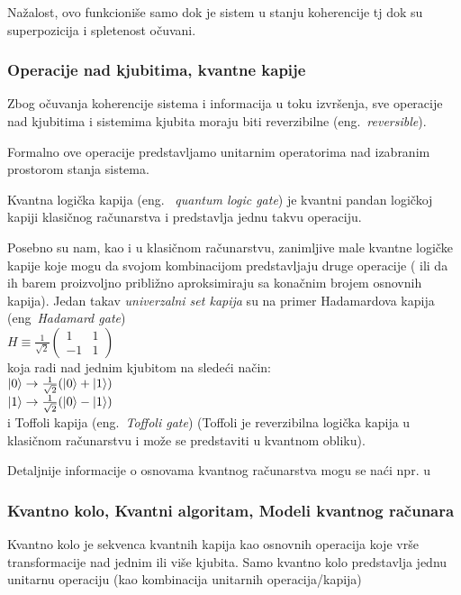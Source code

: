 \documentclass[a4paper]{article}
\begin{document}
{Nažalost, ovo funkcioniše samo dok je sistem u stanju koherencije  tj dok su superpozicija i spletenost očuvani.

\subsubsection {Operacije nad kjubitima, kvantne kapije}

Zbog očuvanja koherencije sistema i informacija u toku izvršenja, sve operacije nad kjubitima i sistemima kjubita moraju biti reverzibilne (eng.~\emph{reversible}).

Formalno ove operacije predstavljamo unitarnim operatorima nad izabranim prostorom stanja sistema.

Kvantna logička kapija (eng. ~\emph{quantum logic gate}) je kvantni pandan logičkoj kapiji klasičnog računarstva i predstavlja jednu takvu operaciju.

Posebno su nam, kao i u klasičnom računarstvu, zanimljive male kvantne logičke kapije koje mogu da svojom kombinacijom predstavljaju druge operacije ( ili da ih barem proizvoljno približno aproksimiraju sa konačnim brojem osnovnih kapija). Jedan takav \emph{univerzalni set kapija} su na primer Hadamardova kapija (eng~\emph{Hadamard gate})\\
\smallskip
$H\equiv\frac{1}{\sqrt{2}}\begin{pmatrix}
1&1\\
-1&1
\end{pmatrix}$\\
\smallskip
koja radi nad jednim kjubitom na sledeći način:\\
\smallskip
$\ket{0} \rightarrow \frac{1}{\sqrt{2}}(\ket{0} + \ket{1})$\\
\smallskip
$\ket{1} \rightarrow \frac{1}{\sqrt{2}}(\ket{0} - \ket{1})$\\

i Toffoli kapija (eng.~\emph{Toffoli gate}) (Toffoli je reverzibilna logička kapija u klasičnom računarstvu i može se predstaviti u kvantnom obliku).

Detaljnije informacije o osnovama kvantnog računarstva mogu se naći npr. u \cite{knjiga}

\subsubsection{Kvantno kolo, Kvantni algoritam, Modeli kvantnog računara}
\label{modeli}

Kvantno kolo je sekvenca kvantnih kapija kao osnovnih operacija koje vrše transformacije nad jednim ili više kjubita. Samo kvantno kolo predstavlja jednu unitarnu operaciju (kao kombinacija unitarnih operacija/kapija)

}
\end{document}

